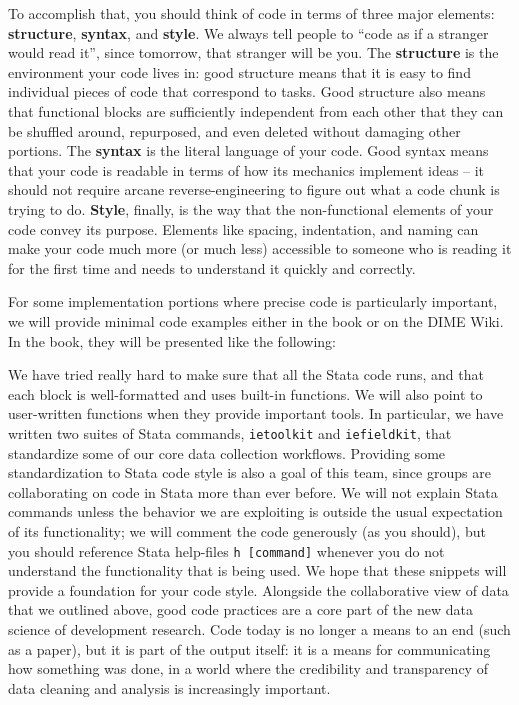 To accomplish that, you should think of code in terms of three major elements:
\textbf{structure}, \textbf{syntax}, and \textbf{style}.
We always tell people to ``code as if a stranger would read it'',
since tomorrow, that stranger will be you.
The \textbf{structure} is the environment your code lives in:
good structure means that it is easy to find individual pieces of code that correspond to tasks.
Good structure also means that functional blocks are sufficiently independent from each other
that they can be shuffled around, repurposed, and even deleted without damaging other portions.
The \textbf{syntax} is the literal language of your code.
Good syntax means that your code is readable
in terms of how its mechanics implement ideas --
it should not require arcane reverse-engineering
to figure out what a code chunk is trying to do.
\textbf{Style}, finally, is the way that the non-functional elements of your code convey its purpose.
Elements like spacing, indentation, and naming can make your code much more (or much less)
accessible to someone who is reading it for the first time and needs to understand it quickly and correctly.

For some implementation portions where precise code is particularly important,
we will provide minimal code examples either in the book or on the DIME Wiki.
In the book, they will be presented like the following:


We have tried really hard to make sure that all the Stata code runs,
and that each block is well-formatted and uses built-in functions.
We will also point to user-written functions when they provide important tools.
In particular, we have written two suites of Stata commands,
\texttt{ietoolkit} and \texttt{iefieldkit},
that standardize some of our core data collection workflows.
Providing some standardization to Stata code style is also a goal of this team,
since groups are collaborating on code in Stata more than ever before.
We will not explain Stata commands unless the behavior we are exploiting
is outside the usual expectation of its functionality;
we will comment the code generously (as you should),
but you should reference Stata help-files \texttt{h [command]}
whenever you do not understand the functionality that is being used.
We hope that these snippets will provide a foundation for your code style.
Alongside the collaborative view of data that we outlined above,
good code practices are a core part of the new data science of development research.
Code today is no longer a means to an end (such as a paper),
but it is part of the output itself: it is a means for communicating how something was done,
in a world where the credibility and transparency of data cleaning and analysis is increasingly important.

